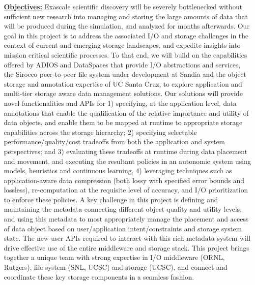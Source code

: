 \documentclass[11pt,letterpaper]{article}
\begin{document}
\underline{\textbf{Objectives:}} Exascale scientific discovery will be
severely bottlenecked without sufficient new research into managing and
storing the large amounts of data that will be produced during the
simulation, and analyzed for months afterwards.  Our goal in this project is
to address the associated I/O and storage challenges in the context of
current and emerging storage landscapes, and expedite insights into mission
critical scientific processes. To that end, we will build on the
capabilities offered by ADIOS and DataSpaces that provide I/O abstractions
and services, the Sirocco peer-to-peer file system under development at
Sandia and the object storage and annotation expertise of UC Santa Cruz, to
explore application and multi-tier storage aware data management
solutions. Our solutions will provide novel functionalities and APIs for
%
1) specifying, at the application level, data annotations that enable the
qualification of the relative importance and utility of data objects, and
enable them to be mapped at runtime to appropriate storage capabilities
across the storage hierarchy;
%
2) specifying selectable performance/quality/cost tradeoffs from both the
application and system perspectives; and
%
3) evaluating these tradeoffs at runtime during data placement and movement,
and executing the resultant policies in an autonomic system using models,
heuristics and continuous learning,
%
4) leveraging techniques such as application-aware data compression (both
lossy with specified error bounds and lossless), re-computation at the
requisite level of accuracy, and I/O prioritization to enforce these
policies.
A key challenge in this project is defining and maintaining the metadata
connecting different object quality and utility levels, and using this metadata 
to most appropriately manage the placement and access of data object based on 
user/application intent/constraints and storage system state.
The new user APIs required to interact with this rich metadata system will
drive effective use of the entire middleware and storage stack.  This project
brings together a unique team with strong expertise in I/O middleware (ORNL,
Rutgers), file system (SNL, UCSC) and storage (UCSC), and connect and
coordinate these key storage components in a seamless fashion.
\end{document}
